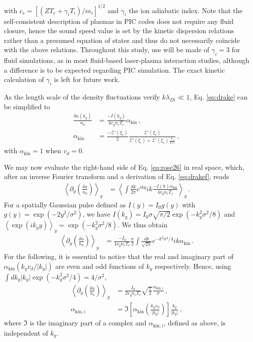 \documentclass[%
 reprint,
 amsmath,amssymb,
 aps,
]{revtex4-1}
\begin{document}
with $c_s=[(ZT_e+\gamma_i T_i)/m_i]^{1/2}$ and $\gamma_i$ the ion adiabatic index.
Note that the self-consistent description of plasmas in PIC codes does not require any  fluid closure, hence the sound speed value is set by the kinetic dispersion relations  rather than a presumed  equation of states and thus do not necessarily co\"incide with the above relations. 
Throughout this study, use will be made of  $\gamma_i=3$ for fluid simulations, as in most fluid-based laser-plasma interaction studies, although a difference is to be expected  regarding PIC simulation. The exact kinetic calculation of $\gamma_i$ is left for future work.

As the length scale of the density fluctuations verify  $k\lambda_{Di} \ll 1 $, Eq.  \eqref{eq:drake} can be simplified to 
 \begin{align}
 \frac{ \delta n(k_y) }{n_0}  &=   \frac{ - I(k_y) }{ 4 v_g n_c T_e }  \alpha_ \mathrm{kin}    \, , \nonumber \\
 \alpha_ \mathrm{kin}    & = \frac{-\mathcal{Z}'( \xi_e) }{2}\frac{\mathcal{Z}'( \xi_i)   }{  \mathcal{Z}'( \xi_i) +\mathcal{Z}'( \xi_e)\frac{ T_i }{  ZT_e} } \, , \label{eq:drakef} 
\end{align}
with  $\alpha_ \mathrm{kin}    =1$  when $v_d=0$. 

We may now evaluate the right-hand side of Eq. \eqref{eq:rose26} in real space, which, after an inverse Fourier transform and a derivation of Eq. \eqref{eq:drakef}, reads
\begin{align}
 \left \langle\partial_y  \left( \frac{ \delta n }{n_0} \right)  \right  \rangle_y&=     \left \langle\int \frac{dk}{2\pi}   e^{ik y} i k  \frac{ -I(k) \alpha_ \mathrm{kin}  }{ 4 v_g n_c T_e }    \right  \rangle_y \, . \label{eq:1}
\end{align}
For a spatially Gaussian pulse defined as $I(y)=I_0g(y)$ with  $ g(y) = \exp(-2y^2/\sigma^2)$, we have $I(k_y)=I_0\sigma \sqrt{\pi/2}  \exp(-k_y^2\sigma^2/8)$ and  $\left \langle \exp(ik_y y) \right  \rangle_y= \exp(-k_y^2\sigma^2/8)$. We thus obtain
\begin{align}
  \left \langle\partial_y  \left( \frac{ \delta n }{n_0} \right)  \right  \rangle_y&=   
  \frac{ -I_0  }{ 4 v_g n_c T_e } \frac{\sigma }{ 2 }\int \frac{dk}{\sqrt{2\pi}} e^{-k^2\sigma^2/4}   i k    \alpha_ \mathrm{kin}   \, . \label{eq:2}
 \end{align}
 For the following, it is essential to notice that  the real and imaginary part of  $\alpha_ \mathrm{kin}(k_yv_d/\vert k_y\vert)$ are even and odd functions of $k_y$ respectively.
 Hence,  using $\int dk_y\vert k_y\vert \exp(-k_y^2\sigma^2/4)=4/\sigma^2$, 
 \begin{align} 
 \left \langle\partial_y  \left( \frac{ \delta n }{n_0} \right)  \right  \rangle_y&=   
  \frac{ I_0  }{ 2 v_g n_c T_e } \sqrt{\frac{\pi}{2}}\frac{\alpha_{\mathrm{kin},i} }{ \sigma }   \, , \label{eq:3}\\
\alpha_{\mathrm{kin},i} &= \Im\left[\alpha_\mathrm{kin}\left(\frac{k_yv_d}{\vert k_y\vert}\right)\right] \frac{k_y}{\vert k_y\vert} \, , \nonumber
\end{align}
where $\Im$ is the imaginary part of a complex and $\alpha_{\mathrm{kin},i} $, defined as above, is independent of $k_y$. 
\end{document}
